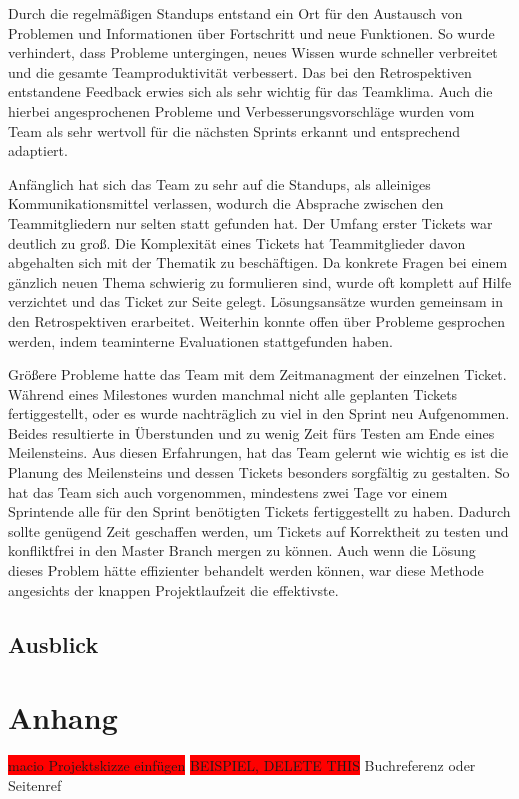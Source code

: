 \documentclass[10pt, a4paper]{article}
\begin{document}
Durch die regelmäßigen Standups entstand ein Ort für den Austausch von Problemen und Informationen über Fortschritt und neue Funktionen.
So wurde verhindert, dass Probleme untergingen, neues Wissen wurde schneller verbreitet und die gesamte Teamproduktivität verbessert.
Das bei den Retrospektiven entstandene Feedback erwies sich als sehr wichtig für das Teamklima.
Auch die hierbei angesprochenen Probleme und Verbesserungsvorschläge wurden vom Team als sehr wertvoll für die nächsten Sprints erkannt und entsprechend adaptiert.

Anfänglich hat sich das Team zu sehr auf die Standups, als alleiniges Kommunikationsmittel verlassen, wodurch die Absprache zwischen den Teammitgliedern nur selten statt gefunden hat.
Der Umfang erster Tickets war deutlich zu groß.
Die Komplexität eines Tickets hat Teammitglieder davon abgehalten sich mit der Thematik zu beschäftigen.
Da konkrete Fragen bei einem gänzlich neuen Thema schwierig zu formulieren sind, wurde oft komplett auf Hilfe verzichtet und das Ticket zur Seite gelegt.
Lösungsansätze wurden gemeinsam in den Retrospektiven erarbeitet.
Weiterhin konnte offen über Probleme gesprochen werden, indem teaminterne Evaluationen stattgefunden haben.

Größere Probleme hatte das Team mit dem Zeitmanagment der einzelnen Ticket.
Während eines Milestones wurden manchmal nicht alle geplanten Tickets fertiggestellt, oder es wurde nachträglich zu viel in den Sprint neu Aufgenommen.
Beides resultierte in Überstunden und zu wenig Zeit fürs Testen am Ende eines Meilensteins.
Aus diesen Erfahrungen, hat das Team gelernt wie wichtig es ist die Planung des Meilensteins und dessen Tickets besonders sorgfältig zu gestalten.
So hat das Team sich auch vorgenommen, mindestens zwei Tage vor einem Sprintende alle für den Sprint benötigten Tickets fertiggestellt zu haben.
Dadurch sollte genügend Zeit geschaffen werden, um Tickets auf Korrektheit zu testen und konfliktfrei in den Master Branch mergen zu können.
Auch wenn die Lösung dieses Problem hätte effizienter behandelt werden können, war diese Methode angesichts der knappen Projektlaufzeit die effektivste.
\subsection{Ausblick}
\newpage
\section{Anhang}
\colorbox{red}{macio Projektskizze einfügen} \label{pdf:macioprojektskizze}
\label{FigmaDesigns}
\label{FlowCharts}
\colorbox{red}{BEISPIEL, DELETE THIS} Buchreferenz \cite{Literaturbeispiel:tom} oder Seitenref \cite{google}
\printbibliography
\end{document}
